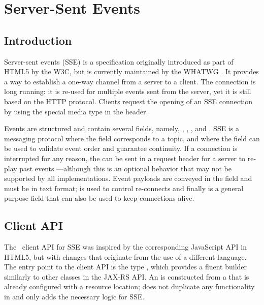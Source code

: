 \chapter{Server-Sent Events}
\label{sse}

\section{Introduction}
\label{sse_introduction}

Server-sent events (SSE) is a specification originally introduced as part of HTML5 by the W3C, but is currently maintained by the WHATWG \cite{sse}. It provides a way to establish a one-way channel from a server to a client. The connection is long running: it is re-used for multiple events sent from the server, yet it is still based on the HTTP protocol. Clients request the opening of an SSE connection by using the special media type  in the  header.

Events are structured and contain several fields, namely, , , ,  and . SSE is a messaging protocol where the  field corresponds to a topic, and where the  field can be used to validate event order and guarantee continuity. If a connection is interrupted for any reason, the  can be sent in a request header for a server to re-play past events ---although this is an optional behavior that may not be supported by all implementations. Event payloads are conveyed in the  field and must be in text format;  is used to control re-connects and finally  is a general purpose field that can also be used to keep connections alive.

\section{Client API}
\label{sse_client_api}

The \jaxrs\ client API for SSE was inspired by the corresponding JavaScript API in HTML5, but with changes that originate from the use of a different language. The entry point to the client API is the type , which provides a fluent builder similarly to other classes in the JAX-RS API. An  is constructed from a  that is already configured with a resource location;  does not duplicate any functionality in  and only adds the necessary logic for SSE. 

